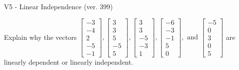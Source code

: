 \begin{exercise}
  \begin{exerciseTitle}V5 - Linear Independence (ver. 399)\end{exerciseTitle}
  \begin{exerciseStatement}
    Explain why the vectors \(\left[\begin{array}{r}
-3 \\
-4 \\
2 \\
-5 \\
-1
\end{array}\right] , \left[\begin{array}{r}
3 \\
3 \\
5 \\
-5 \\
5
\end{array}\right] , \left[\begin{array}{r}
3 \\
3 \\
-5 \\
-3 \\
1
\end{array}\right] , \left[\begin{array}{r}
-6 \\
-3 \\
-1 \\
5 \\
0
\end{array}\right] , \text{ and } \left[\begin{array}{r}
-5 \\
0 \\
3 \\
0 \\
5
\end{array}\right]\) are linearly dependent or linearly independent.	



\end{exerciseStatement}
\end{exercise}
